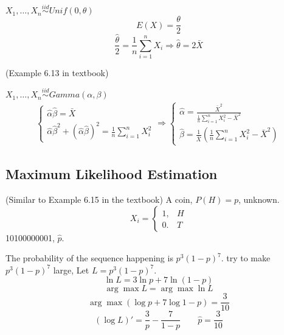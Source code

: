 \begin{exmp}
$X_1,\dots,X_n \overset{iid}{\sim} Unif(0,\theta)$
\[E(X)=\frac{\theta}{2}\]
\[\frac{\hat{\theta}}{2}=\frac{1}{n}\sum_{i=1}^n X_i \Rightarrow \hat{\theta}=2\bar{X}\]
\end{exmp}

\begin{exmp}
(Example 6.13 in textbook)

$X_1,\dots,X_n \overset{iid}{\sim} Gamma(\alpha,\beta)$
\begin{align*}       %
\left  \{              %
\begin{array}{ll}     %
\hat{\alpha}\hat{\beta}=\bar{X} \\    %
\hat{\alpha}\hat{\beta}^2+(\hat{\alpha}\hat{\beta})^2=\frac{1}{n}\sum_{i=1}^n X_i^2     %
\end{array}           %
\right.  \Rightarrow            %
\left  \{              %
\begin{array}{ll}     %
\hat{\alpha}=\frac{\bar{X}^2}{\frac{1}{n}\sum_{i=1}^n X_i^2 - \bar{X}^2} \\    %
\hat{\beta}=\frac{1}{\bar{X}}\left( \frac{1}{n}\sum_{i=1}^n X_i^2 -\bar{X}^2 \right)  %
\end{array}           %
\right.
\end{align*}        %
\end{exmp}

\subsection{Maximum Likelihood Estimation}
\begin{exmp}
(Similar to Example 6.15 in the textbook)
A coin, $P(H)=p$, unknown.
\[X_i=\begin{cases}
1, & H\\
0. & T
\end{cases}\]
10100000001, $\hat{p}$.

The probability of the sequence happening is $p^3(1-p)^7$. try to make $p^3(1-p)^7$ large, Let $L=p^3(1-p)^7$.
\[\ln{L}=3\ln{p} +7 \ln{(1-p)}\]
\[\arg\!\max {L}=\arg\!\max{\ln{L}}\]
\[\arg\!\max{ (\log{p}+7\log{1-p}) }=\frac{3}{10}\]
\[(\log{L})'=\frac{3}{p}-\frac{7}{1-p} \qquad \hat{p}=\frac{3}{10}\]
\end{exmp}

